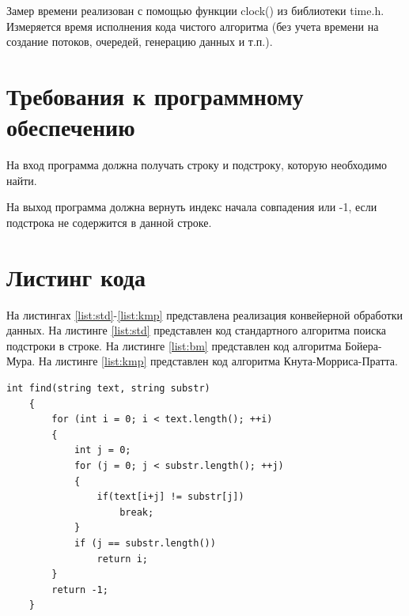 \documentclass[a4paper,12pt]{report}
\begin{document}
        	Замер времени реализован с помощью функции clock() из библиотеки time.h.
        	Измеряется время исполнения кода чистого алгоритма (без учета времени на создание потоков, очередей, генерацию данных и т.п.).

	\section{Требования к программному обеспечению}

			На вход программа должна получать строку и подстроку, которую необходимо найти. 
			
			На выход программа должна вернуть индекс начала совпадения или -1, если подстрока не содержится в данной строке. 

	\section{Листинг кода}
	
        	На листингах \ref{list:std}-\ref{list:kmp} представлена реализация конвейерной обработки данных.
	        На листинге \ref{list:std} представлен код стандартного алгоритма поиска подстроки в строке.
	        На листинге \ref{list:bm} представлен код алгоритма Бойера-Мура.
	        На листинге \ref{list:kmp} представлен код алгоритма Кнута-Морриса-Пратта.
	        
	        \begin{lstlisting}[frame = single, breaklines, label = list:std, caption = Стандартный алгоритм]
	int find(string text, string substr)
	{
	    for (int i = 0; i < text.length(); ++i)
	    {
	        int j = 0;
	        for (j = 0; j < substr.length(); ++j)
	        {
 	            if(text[i+j] != substr[j])
	                break;
	        }
	        if (j == substr.length())
	            return i;
	    }
	    return -1;
	}
	        \end{lstlisting}
	        	
\end{document}
